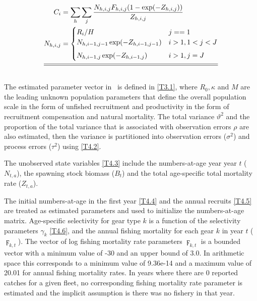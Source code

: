 \begin{table}
\begin{align}
        C_i &= \sum_h \sum_j \dfrac{N_{h,i,j}F_{h,i,j}(1-\exp(-Z_{h,i,j}))}
        {Z_{h,i,j}}                                                     \label{T3.8} \\
        N_{h,i,j} &= \begin{cases}
            R_i / H & j ==1 \\
            N_{h,i-1,j-1} \exp(-Z_{h,i-1,j-1})   & i>1, 1< j < J\\[1ex]
            N_{h,i-1,j} \exp(-Z_{h,i-1,j}) & i>1, j=J
        \end{cases}                                                     \label{T3.9} \\[1ex]
        \hline \hline \nonumber
    \end{align}
    \normalEq
    \end{table}



The estimated parameter vector in \iscam\ is defined in \eqref{T3.1}, where $R_0, \kappa$ and $M$ are the leading unknown population parameters that define the overall population scale in the form of unfished recruitment and productivity in the form of recruitment compensation and natural mortality.  The total variance $\vartheta^2$ and the proportion of the total variance that is associated with observation errors $\rho$ are also estimated, then the variance is partitioned into observation errors ($\sigma^2$) and process errors ($\tau^2$) using \eqref{T4.2}.

The unobserved state variables \eqref{T4.3} include the numbers-at-age year year $t$ ($N_{t,a}$), the spawning stock biomass ($B_t$) and the total age-specific total mortality rate ($Z_{t,a}$).

The initial numbers-at-age in the first year \eqref{T4.4} and the annual recruits \eqref{T4.5} are treated as estimated parameters and used to initialize the numbers-at-age matrix.  Age-specific selectivity for gear type $k$ is a function of the selectivity parameters $\gamma_k$ \eqref{T4.6}, and the annual fishing mortality for each gear $k$ in year $t$ ($\digamma_{k,t}$).  The vector of log fishing mortality rate parameters $\digamma_{k,t}$ is a bounded vector with a minimum value of -30 and an upper bound of 3.0.  In arithmetic space this corresponds to a minimum value of 9.36e-14 and a maximum value of 20.01 for annual fishing mortality rates.  In years where there are 0 reported catches for a given fleet, no corresponding fishing mortality rate parameter is estimated and the implicit assumption is there was no fishery in that year.

